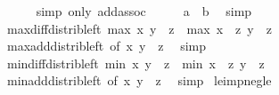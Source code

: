 \begin{isabellebody}
\ \ \ \ \isamarkupfalse%
\ {\isacharparenleft}{\kern0pt}simp\ only{\isacharcolon}{\kern0pt}\ add{\isachardot}{\kern0pt}assoc{\isacharparenright}{\kern0pt}\isanewline
\ \ \isamarkupfalse%
\ \isamarkupfalse%
\ {\isachardoublequoteopen}a\ {\isasymle}\ b{\isachardoublequoteclose}\ \isamarkupfalse%
\ simp\isanewline
{}\isamarkupfalse%
%
\endisatagproof
{\isafoldproof}%
%
\isadelimproof
\isanewline
%
\endisadelimproof
\isanewline
{}\isamarkupfalse%
\ max{\isacharunderscore}{\kern0pt}diff{\isacharunderscore}{\kern0pt}distrib{\isacharunderscore}{\kern0pt}left{\isacharcolon}{\kern0pt}\ {\isachardoublequoteopen}max\ x\ y\ {\isacharminus}{\kern0pt}\ z\ {\isacharequal}{\kern0pt}\ max\ {\isacharparenleft}{\kern0pt}x\ {\isacharminus}{\kern0pt}\ z{\isacharparenright}{\kern0pt}\ {\isacharparenleft}{\kern0pt}y\ {\isacharminus}{\kern0pt}\ z{\isacharparenright}{\kern0pt}{\isachardoublequoteclose}\isanewline
%
\isadelimproof
\ \ %
\endisadelimproof
%
\isatagproof
{}\isamarkupfalse%
\ max{\isacharunderscore}{\kern0pt}add{\isacharunderscore}{\kern0pt}distrib{\isacharunderscore}{\kern0pt}left\ {\isacharbrackleft}{\kern0pt}of\ x\ y\ {\isachardoublequoteopen}{\isacharminus}{\kern0pt}\ z{\isachardoublequoteclose}{\isacharbrackright}{\kern0pt}\ \isamarkupfalse%
\ simp%
\endisatagproof
{\isafoldproof}%
%
\isadelimproof
\isanewline
%
\endisadelimproof
\isanewline
{}\isamarkupfalse%
\ min{\isacharunderscore}{\kern0pt}diff{\isacharunderscore}{\kern0pt}distrib{\isacharunderscore}{\kern0pt}left{\isacharcolon}{\kern0pt}\ {\isachardoublequoteopen}min\ x\ y\ {\isacharminus}{\kern0pt}\ z\ {\isacharequal}{\kern0pt}\ min\ {\isacharparenleft}{\kern0pt}x\ {\isacharminus}{\kern0pt}\ z{\isacharparenright}{\kern0pt}\ {\isacharparenleft}{\kern0pt}y\ {\isacharminus}{\kern0pt}\ z{\isacharparenright}{\kern0pt}{\isachardoublequoteclose}\isanewline
%
\isadelimproof
\ \ %
\endisadelimproof
%
\isatagproof
{}\isamarkupfalse%
\ min{\isacharunderscore}{\kern0pt}add{\isacharunderscore}{\kern0pt}distrib{\isacharunderscore}{\kern0pt}left\ {\isacharbrackleft}{\kern0pt}of\ x\ y\ {\isachardoublequoteopen}{\isacharminus}{\kern0pt}\ z{\isachardoublequoteclose}{\isacharbrackright}{\kern0pt}\ \isamarkupfalse%
\ simp%
\endisatagproof
{\isafoldproof}%
%
\isadelimproof
\isanewline
%
\endisadelimproof
\isanewline
{}\isamarkupfalse%
\ le{\isacharunderscore}{\kern0pt}imp{\isacharunderscore}{\kern0pt}neg{\isacharunderscore}{\kern0pt}le{\isacharcolon}{\kern0pt}\isanewline

\end{isabellebody}
